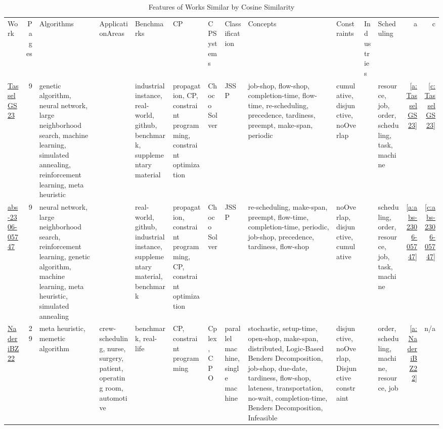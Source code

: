 {\scriptsize
\begin{longtable}{>{\raggedright\arraybackslash}p{3cm}r>{\raggedright\arraybackslash}p{1.5cm}>{\raggedright\arraybackslash}p{1.5cm}>{\raggedright\arraybackslash}p{1.5cm}>{\raggedright\arraybackslash}p{1.5cm}>{\raggedright\arraybackslash}p{1.5cm}>{\raggedright\arraybackslash}p{1.5cm}>{\raggedright\arraybackslash}p{1.5cm}>{\raggedright\arraybackslash}p{1.5cm}>{\raggedright\arraybackslash}p{1.5cm}>{\raggedright\arraybackslash}p{1.5cm}rr}
\rowcolor{white}\caption{Features of Works Similar by Cosine Similarity}\\ \toprule
\rowcolor{white}Work & Pages & Algorithms& ApplicationAreas& Benchmarks& CP& CPSystems& Classification& Concepts& Constraints& Industries& Scheduling & a & c\\ \midrule\endhead
\bottomrule
\endfoot
\href{../works/TasselGS23.pdf}{TasselGS23}~\cite{TasselGS23} & 9 & genetic algorithm, neural network, large neighborhood search, machine learning, simulated annealing, reinforcement learning, meta heuristic &  & industrial instance, real-world, github, benchmark, supplementary material & propagation, CP, constraint programming, constraint optimization & Choco Solver & JSSP & job-shop, flow-shop, completion-time, flow-time, re-scheduling, precedence, tardiness, preempt, make-span, periodic & cumulative, disjunctive, noOverlap &  & resource, job, order, scheduling, task, machine & \ref{a:TasselGS23} & \ref{c:TasselGS23}\\
\href{../works/abs-2306-05747.pdf}{abs-2306-05747}~\cite{abs-2306-05747} & 9 & neural network, large neighborhood search, reinforcement learning, genetic algorithm, machine learning, meta heuristic, simulated annealing &  & real-world, github, industrial instance, supplementary material, benchmark & propagation, constraint programming, CP, constraint optimization & Choco Solver & JSSP & re-scheduling, make-span, preempt, flow-time, completion-time, periodic, job-shop, precedence, tardiness, flow-shop & noOverlap, disjunctive, cumulative &  & scheduling, order, resource, job, task, machine & \ref{a:abs-2306-05747} & \ref{c:abs-2306-05747}\\
\href{../works/NaderiBZ22.pdf}{NaderiBZ22}~\cite{NaderiBZ22} & 29 & meta heuristic, memetic algorithm & crew-scheduling, nurse, surgery, patient, operating room, automotive & benchmark, real-life & CP, constraint programming & Cplex, CPO & parallel machine, single machine & stochastic, setup-time, open-shop, make-span, distributed, Logic-Based Benders Decomposition, job-shop, due-date, tardiness, flow-shop, lateness, transportation, no-wait, completion-time, Benders Decomposition, Infeasible & disjunctive, noOverlap, Disjunctive constraint &  & order, scheduling, machine, resource, job & \ref{a:NaderiBZ22} & n/a\\

\end{longtable}}
